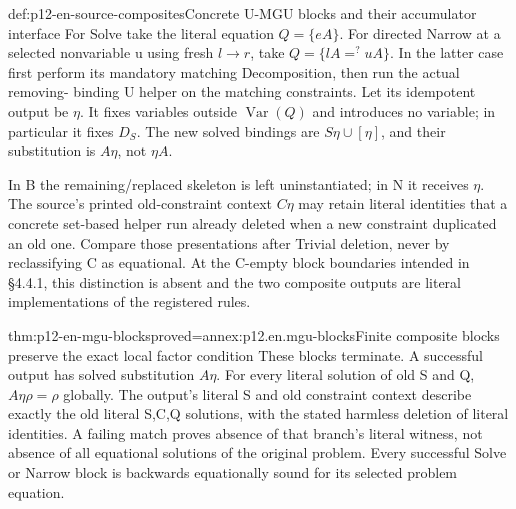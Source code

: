 \begin{hbmethod}{def:p12-en-source-composites}{Concrete U-MGU blocks and their accumulator interface}
For Solve take the literal equation \(Q=\{e A\}\). For directed
Narrow at a selected nonvariable u using fresh \(l\to r\), take
\(Q=\{l A=^{?}u A\}\). In the latter case first perform its
mandatory matching Decomposition, then run the actual removing-
binding U helper on the matching constraints. Let its idempotent
output be \(\eta\). It fixes variables outside \(\operatorname{Var}(Q)\)
and introduces no variable; in particular it fixes \(D_S\).
The new solved bindings are \(S\eta\cup[\eta]\), and their
substitution is \(A\eta\), not \(\eta A\).

In B the remaining/replaced skeleton is left uninstantiated; in N
it receives \(\eta\). The source's printed old-constraint context
\(C\eta\) may retain literal identities that a concrete set-based
helper run already deleted when a new constraint duplicated an old
one. Compare those presentations after Trivial deletion, never by
reclassifying C as equational. At the C-empty block boundaries
intended in \S4.4.1, this distinction is absent and the two composite
outputs are literal implementations of the registered rules.
\cite[\S2.2.3--2.2.4, pp.~454--457; \S4.4.1, p.~499]{BaaderSnyder2001}
\end{hbmethod}

\begin{hbtheorem}{thm:p12-en-mgu-blocks}{proved=annex:p12.en.mgu-blocks}{Finite composite blocks preserve the exact local factor condition}
These blocks terminate. A successful output has solved substitution
\(A\eta\). For every literal solution of old S and Q,
\(A\eta\rho=\rho\) globally. The output's literal S and old
constraint context describe exactly the old literal S,C,Q solutions,
with the stated harmless deletion of literal identities. A failing
match proves absence of that branch's literal witness, not absence
of all equational solutions of the original problem. Every successful
Solve or Narrow block is backwards equationally sound for its
selected problem equation.
\end{hbtheorem}

